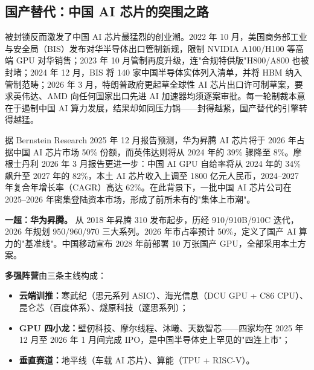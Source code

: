 
\subsection{国产替代：中国 AI 芯片的突围之路}
\label{subsec:chips-china}

被封锁反而激发了中国 AI 芯片最猛烈的创业潮。2022 年 10 月，美国商务部工业与安全局（BIS）发布对华半导体出口管制新规，限制 NVIDIA A100/H100 等高端 GPU 对华销售；2023 年 10 月管制再度升级，连"合规特供版"H800/A800 也被封堵；2024 年 12 月，BIS 将 140 家中国半导体实体列入清单，并将 HBM 纳入管制范畴；2026 年 3 月，特朗普政府更起草全球性 AI 芯片出口许可制草案，要求英伟达、AMD 向任何国家出口先进 AI 加速器均须逐案审批。每一轮制裁本意在于遏制中国 AI 算力发展，结果却如同压力锅——封得越紧，国产替代的引擎转得越猛。

据 Bernstein Research 2025 年 12 月报告预测，华为昇腾 AI 芯片将于 2026 年占据中国 AI 芯片市场 50\% 份额，而英伟达则将从 2024 年的 39\% 骤降至 8\%。摩根士丹利 2026 年 3 月报告更进一步：中国 AI GPU 自给率将从 2024 年的 34\% 飙升至 2027 年的 82\%，本土 AI 芯片收入上调至 1800 亿元人民币，2024--2027 年复合年增长率（CAGR）高达 62\%。在此背景下，一批中国 AI 芯片公司在 2025--2026 年密集登陆资本市场，形成了前所未有的"集体上市潮"。

\begin{corebox}
\textbf{一超：华为昇腾。} 从 2018 年昇腾 310 发布起步，历经 910/910B/910C 迭代，2026 年规划 950/960/970 三大系列。2026 年市占率预计 50\%，定义了国产 AI 算力的"基准线"。中国移动宣布 2028 年前部署 10 万张国产 GPU，全部采用本土方案。

\textbf{多强阵营}由三条主线构成：
\begin{itemize}
  \item \textbf{云端训推：}寒武纪（思元系列 ASIC）、海光信息（DCU GPU + C86 CPU）、昆仑芯（百度体系）、燧原科技（邃思系列）；
  \item \textbf{GPU 四小龙：}壁仞科技、摩尔线程、沐曦、天数智芯——四家均在 2025 年 12 月至 2026 年 1 月间完成 IPO，是中国半导体史上罕见的"四连上市"；
  \item \textbf{垂直赛道：}地平线（车载 AI 芯片）、算能（TPU + RISC-V）。
\end{itemize}
\end{corebox}

